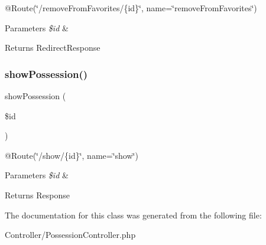 @\+Route(\char`\"{}/remove\+From\+Favorites/\{id\}\char`\"{}, name=\char`\"{}remove\+From\+Favorites\char`\"{}) 
\begin{DoxyParams}{Parameters}
{\em \$id} & \\
\hline
\end{DoxyParams}
\begin{DoxyReturn}{Returns}
Redirect\+Response 
\end{DoxyReturn}
\mbox{\label{class_app_1_1_controller_1_1_possession_controller_ab1b51061dc3635ef40e9c5bb0880f519}} 
\subsubsection{\texorpdfstring{showPossession()}{showPossession()}}
{\footnotesize\ttfamily show\+Possession (\begin{DoxyParamCaption}\item[{}]{\$id }\end{DoxyParamCaption})}

@\+Route(\char`\"{}/show/\{id\}\char`\"{}, name=\char`\"{}show\char`\"{}) 
\begin{DoxyParams}{Parameters}
{\em \$id} & \\
\hline
\end{DoxyParams}
\begin{DoxyReturn}{Returns}
Response 
\end{DoxyReturn}


The documentation for this class was generated from the following file\+:\begin{DoxyCompactItemize}
\item 
Controller/Possession\+Controller.\+php\end{DoxyCompactItemize}

